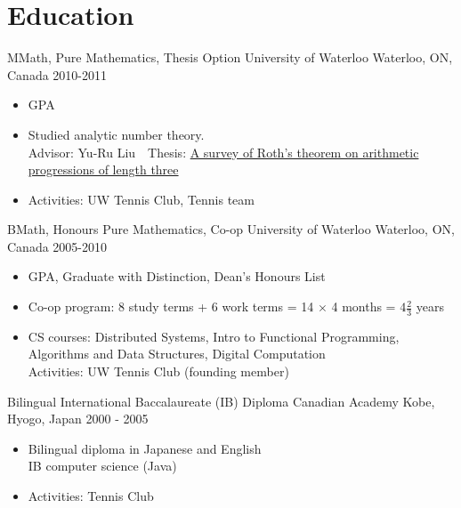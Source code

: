 \section{Education}
\cventry
  {MMath, Pure Mathematics, Thesis Option} %
  {University of Waterloo} %
  {Waterloo, ON, Canada} %
  {2010-2011} %
  {
    \begin{itemize} %
      \liststyle
      \item {GPA}
      \item {Studied analytic number theory.\\
        Advisor: Yu-Ru Liu\ \ Thesis: \href{http://hdl.handle.net/10012/6406}{A survey of Roth's theorem on arithmetic progressions of length three}}
      \item {Activities: UW Tennis Club, Tennis team}
    \end{itemize}
  }

\cventry
  {BMath, Honours Pure Mathematics, Co-op} %
  {University of Waterloo} %
  {Waterloo, ON, Canada} %
  {2005-2010} %
  {
    \begin{itemize} %
      \liststyle
      \item {GPA, Graduate with Distinction, Dean's Honours List}
      \item {
        Co-op program: 8 study terms + 6 work terms = 14 $\times$ 4 months = $4 \frac{2}{3}$ years
      }
      \item {
        CS courses: Distributed Systems, Intro to Functional Programming, Algorithms and Data Structures, Digital Computation\\
        Activities: UW Tennis Club (founding member)
      }
    \end{itemize}
  }

\cventry
  {Bilingual International Baccalaureate (IB) Diploma} %
  {Canadian Academy} %
  {Kobe, Hyogo, Japan} %
  {2000 - 2005} %
  {
    \begin{itemize} %
      \liststyle
      \item {
        Bilingual diploma in Japanese and English \\
        IB computer science (Java)
      }
      \item {Activities: Tennis Club}
    \end{itemize}
  }
